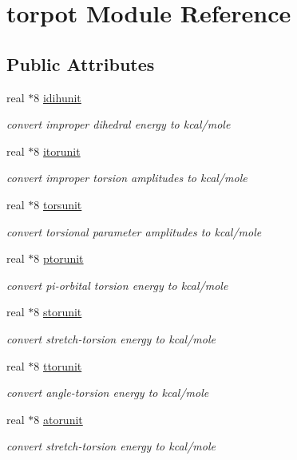 \hypertarget{classtorpot}{\section{torpot Module Reference}
\label{classtorpot}
}
\subsection*{Public Attributes}
\begin{DoxyCompactItemize}
\item 
real $\ast$8 \hyperlink{classtorpot_a82b672d0c03ddf1938511751d7640693}{idihunit}
\begin{DoxyCompactList}\small\item\em convert improper dihedral energy to kcal/mole \end{DoxyCompactList}\item 
real $\ast$8 \hyperlink{classtorpot_a4efda8e1fc851f01a1263a24075aa212}{itorunit}
\begin{DoxyCompactList}\small\item\em convert improper torsion amplitudes to kcal/mole \end{DoxyCompactList}\item 
real $\ast$8 \hyperlink{classtorpot_a96c1dd193b438c4c00102f314a7951e5}{torsunit}
\begin{DoxyCompactList}\small\item\em convert torsional parameter amplitudes to kcal/mole \end{DoxyCompactList}\item 
real $\ast$8 \hyperlink{classtorpot_a3423a55797683f42ce3eb09a8e936fc6}{ptorunit}
\begin{DoxyCompactList}\small\item\em convert pi-\/orbital torsion energy to kcal/mole \end{DoxyCompactList}\item 
real $\ast$8 \hyperlink{classtorpot_af896106db7360f2c4d737174dc6baf3e}{storunit}
\begin{DoxyCompactList}\small\item\em convert stretch-\/torsion energy to kcal/mole \end{DoxyCompactList}\item 
real $\ast$8 \hyperlink{classtorpot_aa8885ebf7c821b9060064e99a5f95f8a}{ttorunit}
\begin{DoxyCompactList}\small\item\em convert angle-\/torsion energy to kcal/mole \end{DoxyCompactList}\item 
real $\ast$8 \hyperlink{classtorpot_ae5574ae24c2253ced1bf6062f26323ac}{atorunit}
\begin{DoxyCompactList}\small\item\em convert stretch-\/torsion energy to kcal/mole \end{DoxyCompactList}\end{DoxyCompactItemize}


